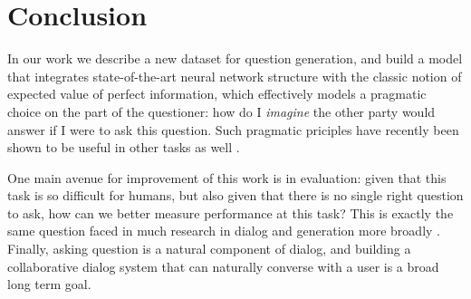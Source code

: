 \documentclass[11pt,a4paper]{article}
\begin{document}
\section{Conclusion}

In our work we describe a new dataset for question generation, and build a model that integrates state-of-the-art neural network structure with the classic notion of expected value of perfect information, which effectively models a pragmatic choice on the part of the questioner: how do I \emph{imagine} the other party would answer if I were to ask this question. Such pragmatic priciples have recently been shown to be useful in other tasks as well \cite{golland2010game,smith2013learning,orita2015discourse,andreas2016reasoning}.

One main avenue for improvement of this work is in evaluation: given that this task is so difficult for humans, but also given that there is no single right question to ask, how can we better measure performance at this task? This is exactly the same question faced in much research in dialog and generation more broadly \cite{paek2001empirical,lowe2015ubuntu,liu2016not,kannan2017adversarial}. Finally, asking question is a natural component of dialog, and building a collaborative dialog system that can naturally converse with a user is a broad long term goal.



\end{document}
